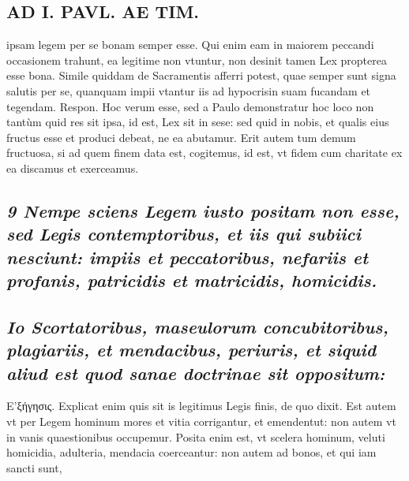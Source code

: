 \documentclass{article}
\begin{document}
\begin{pages}
\section*{AD I. PAVL. AE TIM. }
\marginpar{[ p.20 ]}\pstart ipsam legem per se bonam semper esse. Qui enim eam in maiorem peccandi occasionem trahunt, ea legitime non vtuntur, non desinit tamen Lex propterea esse bona. Simile quiddam de Sacramentis afferri potest, quae semper sunt signa salutis per se, quanquam impii vtantur iis ad hypocrisin suam fucandam et tegendam. Respon. Hoc verum esse, sed a Paulo demonstratur hoc loco non tantùm quid res sit ipsa, id est, Lex sit in sese: sed quid in nobis, et qualis eius fructus esse et produci debeat, ne ea abutamur. Erit autem tum demum fructuosa, si ad quem finem data est, cogitemus, id est, vt fidem cum charitate ex ea discamus et exerceamus.  \pend
{}
{}
\subsection*{\textit{9 Nempe sciens Legem iusto positam non esse, sed Legis contemptoribus, et iis qui subiici nesciunt: impiis et peccatoribus, nefariis et profanis, patricidis et matricidis, homicidis. }}
{}
\subsection*{\textit{Io Scortatoribus, maseulorum concubitoribus, plagiariis, et mendacibus, periuris, et siquid aliud est quod sanae doctrinae sit oppositum: }}\pstart E’ξήγησις. Explicat enim quis sit is legitimus Legis finis, de quo dixit. Est autem vt per Legem hominum mores et vitia corrigantur, et emendentut: non autem vt in vanis quaestionibus occupemur. Posita enim est, vt scelera hominum, veluti homicidia, adulteria, mendacia coerceantur: non autem ad bonos, et qui iam sancti sunt,  \pend

\end{pages}
\end{document}
